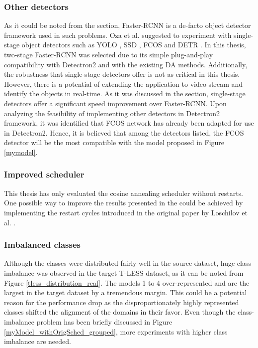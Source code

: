 \subsubsection{Other detectors}
As it could be noted from the  section, Faster-RCNN is a de-facto object detector framework used in such problems. Oza et al. \cite{Oza2021} suggested to experiment with single-stage object detectors such as YOLO \cite{Redmon2015a}, SSD \cite{Liu2015}, FCOS \cite{Tian2019} and DETR \cite{Carion2020}. In this thesis, two-stage Faster-RCNN was selected due to its simple plug-and-play compatibility with Detectron2 \cite{wu2019Detectron2} and with the existing DA methods. Additionally, the robustness that single-stage detectors offer is not as critical in this thesis. However, there is a potential of extending the application to video-stream and identify the objects in real-time. As it was discussed in the  section, single-stage detectors offer a significant speed improvement over Faster-RCNN. Upon analyzing the feasibility of implementing other detectors in Detectron2 \cite{wu2019Detectron2} framework, it was identified that FCOS network has already been adapted for use in Detectron2. Hence, it is believed that among the detectors listed, the FCOS detector will be the most compatible with the model proposed in Figure \ref{mymodel}. 


\subsubsection{Improved scheduler}
This thesis has only evaluated the cosine annealing scheduler without restarts. One possible way to improve the results presented in the  could be achieved by implementing the restart cycles introduced in the original paper by Loschilov et al. \cite{Loshchilov2016}.   


\subsubsection{Imbalanced classes}
Although the classes were distributed fairly well in the source dataset, huge class imbalance was observed in the target T-LESS dataset, as it can be noted from Figure \ref{tless_distribution_real}. The models 1 to 4 over-represented and are the largest in the target dataset by a tremendous margin. This could be a potential reason for the performance drop as the disproportionately highly represented classes shifted the alignment of the domains in their favor. Even though the class-imbalance problem has been briefly discussed in Figure \ref{myModel_withOrigSched_grouped}, more experiments with higher class imbalance are needed.

